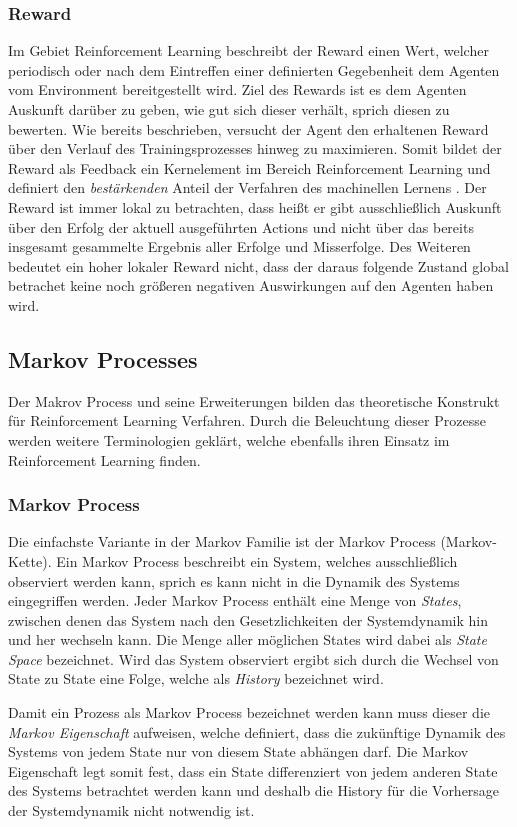 \documentclass[11pt]{scrartcl}
\begin{document}
\subsubsection{Reward}
Im Gebiet Reinforcement Learning beschreibt der Reward einen Wert, welcher periodisch oder nach
dem Eintreffen einer definierten Gegebenheit dem Agenten vom Environment bereitgestellt wird.
Ziel des Rewards ist es dem Agenten Auskunft darüber zu geben, wie gut sich dieser verhält, sprich
diesen zu bewerten. Wie bereits beschrieben, versucht der Agent den erhaltenen Reward über den
Verlauf des Trainingsprozesses hinweg zu maximieren. Somit bildet der Reward als Feedback ein
Kernelement im Bereich Reinforcement Learning und definiert den \textit{bestärkenden} Anteil der 
Verfahren des machinellen Lernens \cite[~S.6 f.]{L2018}. Der Reward ist immer lokal zu betrachten,
dass heißt er gibt ausschließlich Auskunft über den Erfolg der aktuell ausgeführten Actions und
nicht über das bereits insgesamt gesammelte Ergebnis aller Erfolge und Misserfolge. Des Weiteren
bedeutet ein hoher lokaler Reward nicht, dass der daraus folgende Zustand global betrachet keine
noch größeren negativen Auswirkungen auf den Agenten haben wird.


\subsection{Markov Processes}
Der Makrov Process und seine Erweiterungen bilden das theoretische Konstrukt für Reinforcement Learning
Verfahren. Durch die Beleuchtung dieser Prozesse werden weitere Terminologien geklärt, welche ebenfalls
ihren Einsatz im Reinforcement Learning finden.


\subsubsection{Markov Process}
Die einfachste Variante in der Markov Familie ist der Markov Process (Markov-Kette). Ein Markov Process
beschreibt ein System, welches ausschließlich observiert werden kann, sprich es kann nicht in die Dynamik
des Systems eingegriffen werden. Jeder Markov Process enthält eine Menge von \textit{States}, zwischen
denen das System nach den Gesetzlichkeiten der Systemdynamik hin und her wechseln kann. Die Menge aller
möglichen States wird dabei als \textit{State Space} bezeichnet. Wird das System observiert ergibt sich
durch die Wechsel von State zu State eine Folge, welche als \textit{History} bezeichnet wird. 

Damit ein Prozess als Markov Process bezeichnet werden kann muss dieser die \textit{Markov Eigenschaft}
aufweisen, welche definiert, dass die zukünftige Dynamik des Systems von jedem State nur von diesem State abhängen darf. Die Markov Eigenschaft legt somit fest, dass ein State differenziert von jedem anderen State 
des Systems betrachtet werden kann und deshalb die History für die Vorhersage der Systemdynamik nicht
notwendig ist.
\end{document}
